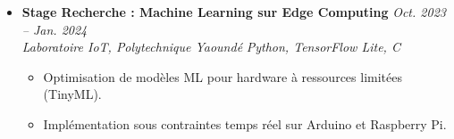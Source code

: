 \documentclass[a4paper,11pt]{article}
\begin{document}
\begin{itemize}[leftmargin=*, label={-}]
\item \textbf{Stage Recherche : Machine Learning sur Edge Computing} \hfill \textit{Oct. 2023 -- Jan. 2024} \\
\textit{Laboratoire IoT, Polytechnique Yaoundé} \hfill \textit{Python, TensorFlow Lite, C}
\vspace{-2pt}
    \begin{itemize}[leftmargin=0.4cm, nosep, label=\tiny$\bullet$]
        \item \small{Optimisation de modèles ML pour hardware à ressources limitées (TinyML).}
        \item \small{Implémentation sous contraintes temps réel sur Arduino et Raspberry Pi.}
    \end{itemize}
\vspace{6pt}

\end{itemize}

\end{document}
